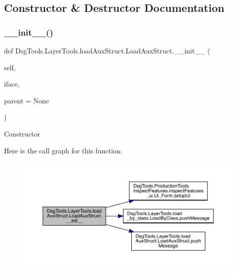 \subsection{Constructor \& Destructor Documentation}
\mbox{\label{class_dsg_tools_1_1_layer_tools_1_1load_aux_struct_1_1_load_aux_struct_a05292caf1fd2062a9366f5a80a676747}} 
\subsubsection{\texorpdfstring{\+\_\+\+\_\+init\+\_\+\+\_\+()}{\_\_init\_\_()}}
{\footnotesize\ttfamily def Dsg\+Tools.\+Layer\+Tools.\+load\+Aux\+Struct.\+Load\+Aux\+Struct.\+\_\+\+\_\+init\+\_\+\+\_\+ (\begin{DoxyParamCaption}\item[{}]{self,  }\item[{}]{iface,  }\item[{}]{parent = {\ttfamily None} }\end{DoxyParamCaption})}

\begin{DoxyVerb}Constructor
\end{DoxyVerb}
 Here is the call graph for this function\+:
\nopagebreak
\begin{figure}[H]
\begin{center}
\leavevmode
\includegraphics[width=350pt]{class_dsg_tools_1_1_layer_tools_1_1load_aux_struct_1_1_load_aux_struct_a05292caf1fd2062a9366f5a80a676747_cgraph}
\end{center}
\end{figure}


